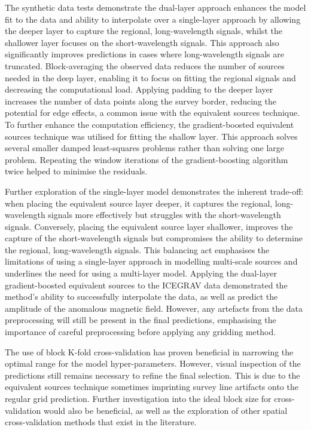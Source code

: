 The synthetic data tests demonstrate the dual-layer approach enhances the model fit to the data and ability to interpolate over a single-layer approach by allowing the deeper layer to capture the regional, long-wavelength signals, whilst the shallower layer focuses on the short-wavelength signals. This approach also significantly improves predictions in cases where long-wavelength signals are truncated. Block-averaging the observed data reduces the number of sources needed in the deep layer, enabling it to focus on fitting the regional signals and decreasing the computational load. Applying padding to the deeper layer increases the number of data points along the survey border, reducing the potential for edge effects, a common issue with the equivalent sources technique. 
To further enhance the computation efficiency, the gradient-boosted equivalent sources technique was utilised for fitting the shallow layer. This approach solves several smaller damped least-squares problems rather than solving one large problem. Repeating the window iterations of the gradient-boosting algorithm twice helped to minimise the residuals.

Further exploration of the single-layer model demonstrates the inherent trade-off: when placing the equivalent source layer deeper, it captures the regional, long-wavelength signals more effectively but struggles with the short-wavelength signals. Conversely, placing the equivalent source layer shallower, improves the capture of the short-wavelength signals but compromises the ability to determine the regional, long-wavelength signals. This balancing act emphasises the limitations of using a single-layer approach in modelling multi-scale sources and underlines the need for using a multi-layer model. Applying the dual-layer gradient-boosted equivalent sources to the ICEGRAV data demonstrated the method’s ability to successfully interpolate the data, as well as predict the amplitude of the anomalous magnetic field. However, any artefacts from the data preprocessing will still be present in the final predictions, emphasising the importance of careful preprocessing before applying any gridding method.

The use of block K-fold cross-validation has proven beneficial in narrowing the optimal range for the model hyper-parameters. However, visual inspection of the predictions still remains necessary to refine the final selection. This is due to the equivalent sources technique sometimes imprinting survey line artifacts onto the regular grid prediction. Further investigation into the ideal block size for cross-validation would also be beneficial, as well as the exploration of other spatial cross-validation methods that exist in the literature.



